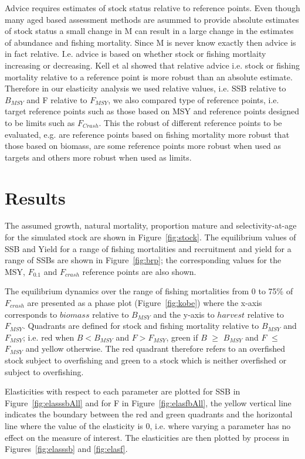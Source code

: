 \documentclass{pnastwo}
\begin{document}
\begin{article}
Advice requires estimates of stock status relative to reference points. Even though many aged based assessment methods are asummed to provide absolute 
estimates of stock status a small change in M can result in a large change in the estimates of abundance and fishing mortality. Since M is never know 
exactly then advice is in fact relative. I.e. advice is based on whether stock or fishing mortlaity increasing or decreasing. Kell et al showed that relative advice i.e. 
stock or fishing mortality relative to a reference point is more robust than an absolute estimate. Therefore in our elasticity analysis we used relative 
values, i.e. SSB relative to $B_{MSY}$ and F relative to $F_{MSY}$, we also compared type of reference points, i.e. target reference points such as those 
based on MSY and reference points designed to be limits such as $F_{Crash}$. This the robust of different reference points to be evaluated, e.g. are reference points 
based on fishing mortality more robust that those based on biomass, are some reference points more robust when used as targets and others more robust 
when used as limits. 

\section*{Results}

The assumed growth, natural mortality, proportion mature and selectivity-at-age for the simulated stock are shown in Figure~\ref{fig:stock}. The 
equilibrium values of SSB and Yield for a range of fishing mortalities and recruitment and yield for a range of SSBs are shown in Figure~\ref{fig:brp}; 
the corresponding values for the MSY, $F_{0.1}$ and $F_{crash}$ reference points are also shown. 

The equilibrium dynamics over the range of fishing mortalities from 0 to 75\% of $F_{crash}$ are presented as a phase plot (Figure~\ref{fig:kobe})
where the x-axis corresponds to $biomass$ relative to $B_{MSY}$ and the y-axis to $harvest$ relative to $F_{MSY}$.
Quadrants are defined for stock and fishing mortality relative to $B_{MSY}$ and $F_{MSY}$; i.e. red when $B<B_{MSY}$ and $F>F_{MSY}$, green 
if $B$ $\geq$ $B_{MSY}$ and $F$ $\leq$ $F_{MSY}$ and yellow otherwise. The red quadrant therefore refers to an overfished stock subject to overfishing and  
green to a stock which is neither overfished or subject to overfishing.

Elasticities with respect to each parameter are plotted for SSB in Figure~\ref{fig:elasssbAll} and for F in Figure~\ref{fig:elasfbAll}, the yellow vertical
line indicates the boundary between the red and green quadrants and the horizontal  line where the value of the elasticity is 0, i.e. where varying a parameter 
has no effect on the measure of interest. The elasticities are then plotted by process in Figures~\ref{fig:elasssb} and \ref{fig:elasf}. 


\end{article}
\end{document}
